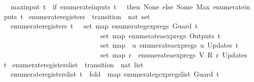 \begin{isabellebody}
\ \ {\isachardoublequoteopen}max{\isacharunderscore}input\ t\ {\isacharequal}\ {\isacharparenleft}if\ enumerate{\isacharunderscore}inputs\ t\ {\isacharequal}\ {\isacharbraceleft}{\isacharbraceright}\ then\ None\ else\ Some\ {\isacharparenleft}Max\ {\isacharparenleft}enumerate{\isacharunderscore}inputs\ t{\isacharparenright}{\isacharparenright}{\isacharparenright}{\isachardoublequoteclose}\isanewline
\isanewline
{}\isamarkupfalse%
\ enumerate{\isacharunderscore}registers\ {\isacharcolon}{\isacharcolon}\ {\isachardoublequoteopen}transition\ {\isasymRightarrow}\ nat\ set{\isachardoublequoteclose}\ \isanewline
\ \ {\isachardoublequoteopen}enumerate{\isacharunderscore}registers\ t\ {\isacharequal}\ {\isacharparenleft}{\isasymUnion}\ set\ {\isacharparenleft}map\ enumerate{\isacharunderscore}gexp{\isacharunderscore}regs\ {\isacharparenleft}Guard\ t{\isacharparenright}{\isacharparenright}{\isacharparenright}\ {\isasymunion}\isanewline
\ \ \ \ \ \ \ \ \ \ \ \ \ \ \ \ \ \ \ \ \ \ \ \ \ \ \ {\isacharparenleft}{\isasymUnion}\ set\ {\isacharparenleft}map\ enumerate{\isacharunderscore}aexp{\isacharunderscore}regs\ {\isacharparenleft}Outputs\ t{\isacharparenright}{\isacharparenright}{\isacharparenright}\ {\isasymunion}\isanewline
\ \ \ \ \ \ \ \ \ \ \ \ \ \ \ \ \ \ \ \ \ \ \ \ \ \ \ {\isacharparenleft}{\isasymUnion}\ set\ {\isacharparenleft}map\ {\isacharparenleft}{\isasymlambda}{\isacharparenleft}{\isacharunderscore}{\isacharcomma}\ u{\isacharparenright}{\isachardot}\ enumerate{\isacharunderscore}aexp{\isacharunderscore}regs\ u{\isacharparenright}\ {\isacharparenleft}Updates\ t{\isacharparenright}{\isacharparenright}{\isacharparenright}\ {\isasymunion}\isanewline
\ \ \ \ \ \ \ \ \ \ \ \ \ \ \ \ \ \ \ \ \ \ \ \ \ \ \ {\isacharparenleft}{\isasymUnion}\ set\ {\isacharparenleft}map\ {\isacharparenleft}{\isasymlambda}{\isacharparenleft}r{\isacharcomma}\ {\isacharunderscore}{\isacharparenright}{\isachardot}\ enumerate{\isacharunderscore}aexp{\isacharunderscore}regs\ {\isacharparenleft}V\ {\isacharparenleft}R\ r{\isacharparenright}{\isacharparenright}{\isacharparenright}\ {\isacharparenleft}Updates\ t{\isacharparenright}{\isacharparenright}{\isacharparenright}{\isachardoublequoteclose}\isanewline
\isanewline
{}\isamarkupfalse%
\ enumerate{\isacharunderscore}registers{\isacharunderscore}list\ {\isacharcolon}{\isacharcolon}\ {\isachardoublequoteopen}transition\ {\isasymRightarrow}\ nat\ list{\isachardoublequoteclose}\ \isanewline
\ \ {\isachardoublequoteopen}enumerate{\isacharunderscore}registers{\isacharunderscore}list\ t\ {\isacharequal}\ {\isacharparenleft}fold\ {\isacharparenleft}{\isacharat}{\isacharparenright}\ {\isacharparenleft}map\ enumerate{\isacharunderscore}gexp{\isacharunderscore}regs{\isacharunderscore}list\ {\isacharparenleft}Guard\ t{\isacharparenright}{\isacharparenright}\ {\isacharbrackleft}{\isacharbrackright}{\isacharparenright}\ {\isacharat}\isanewline

\end{isabellebody}
